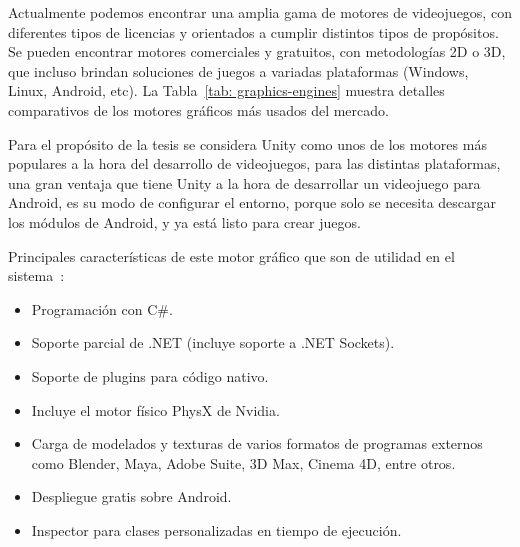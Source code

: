 Actualmente podemos encontrar una amplia gama de motores de videojuegos, con diferentes tipos de licencias y orientados a cumplir distintos tipos de propósitos. Se pueden encontrar motores comerciales y gratuitos, con metodologías 2D o 3D, que incluso brindan soluciones de juegos a variadas plataformas (Windows, Linux, Android, etc). La Tabla~\ref{tab: graphics-engines} muestra detalles comparativos de los motores gráficos más usados del mercado.

Para el propósito de la tesis se considera Unity como unos de los motores más populares a la hora del desarrollo de videojuegos, para las distintas plataformas, una gran ventaja que tiene Unity a la hora de desarrollar un videojuego para Android, es su modo de configurar el entorno, porque solo se necesita descargar los módulos de Android, y ya está listo para crear juegos.

Principales características de este motor gráfico que son de utilidad en el sistema~\cite{unity3d}:
\begin{itemize}
    \item Programación con C\#.
    \item Soporte parcial de .NET (incluye soporte a .NET Sockets).
    \item Soporte de plugins para código nativo.
    \item Incluye el motor físico PhysX de Nvidia.
    \item Carga de modelados y texturas de varios formatos de programas externos como Blender, Maya, Adobe Suite, 3D Max, Cinema 4D, entre otros.
    \item Despliegue gratis sobre Android.
    \item Inspector para clases personalizadas en tiempo de ejecución.
\end{itemize}


